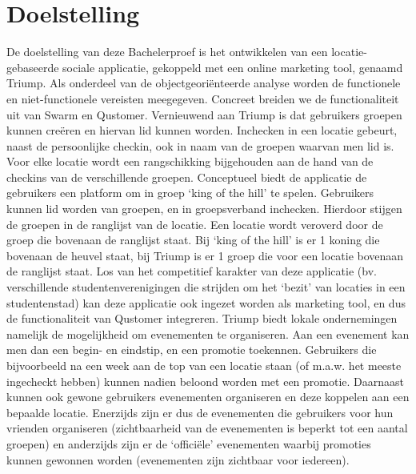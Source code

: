 
\chapter{Doelstelling}

De doelstelling van deze Bachelerproef is het ontwikkelen van een locatie-gebaseerde sociale applicatie, gekoppeld met een online marketing tool, genaamd Triump. Als onderdeel van de objectgeoriënteerde analyse worden de functionele en niet-functionele vereisten meegegeven.
Concreet breiden we de functionaliteit uit van Swarm en Qustomer. Vernieuwend aan Triump is dat gebruikers groepen kunnen creëren en hiervan lid kunnen worden. Inchecken in een locatie gebeurt, naast de persoonlijke checkin, ook in naam van de groepen waarvan men lid is. 
Voor elke locatie wordt een rangschikking bijgehouden aan de hand van de checkins van de verschillende groepen. Conceptueel biedt de applicatie de gebruikers een platform om in groep `king of the hill' te spelen. Gebruikers kunnen lid worden van groepen, en in groepsverband inchecken. Hierdoor stijgen de groepen in de ranglijst van de locatie. Een locatie wordt veroverd door de groep die bovenaan de ranglijst staat.
Bij `king of the hill' is er 1 koning die bovenaan de heuvel staat, bij Triump is er 1 groep die voor een locatie bovenaan de ranglijst staat.
Los van het competitief karakter van deze applicatie (bv. verschillende studentenverenigingen die strijden om het ‘bezit’ van locaties in een studentenstad) kan deze applicatie ook ingezet worden als marketing tool, en dus de functionaliteit van Qustomer integreren.
Triump biedt lokale ondernemingen namelijk de mogelijkheid om evenementen te organiseren. Aan een evenement kan men dan een begin- en eindstip, en een promotie toekennen. Gebruikers die bijvoorbeeld na een week aan de top van een locatie staan (of m.a.w. het meeste ingecheckt hebben) kunnen nadien beloond worden met een promotie. Daarnaast kunnen ook gewone gebruikers evenementen organiseren en deze koppelen aan een bepaalde locatie.
Enerzijds zijn er dus de evenementen die gebruikers voor hun vrienden organiseren (zichtbaarheid van de evenementen is beperkt tot een aantal groepen) en anderzijds zijn er de `officiële' evenementen waarbij promoties kunnen gewonnen worden (evenementen zijn zichtbaar voor iedereen). 


